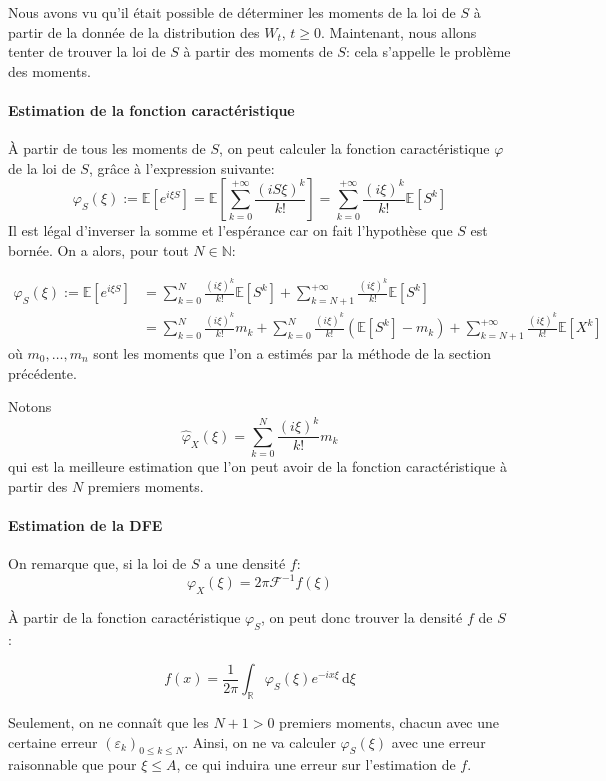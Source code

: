 \documentclass[12pt]{article}
\newcommand{\pth}[1]{\left(#1\right)}
\newcommand{\cro}[1]{\left[#1\right]}
\newcommand{\vg}{,\,}
\newcommand{\de}{\,\mathrm{d}}
\newcommand{\En}{\mathbb{N}}
\newcommand{\Esp}[1]{\mathbb{E}\cro{#1}}
\begin{document}
Nous avons vu qu'il était possible de déterminer les moments de la loi de $S$ à partir de la donnée de la distribution des $W_t\vg t\geqslant 0$. Maintenant, nous allons tenter de trouver la loi de $S$ à partir des moments de $S$: cela s'appelle le problème des moments.

\paragraph{Estimation de la fonction caractéristique}

À partir de tous les moments de $S$, on peut calculer la fonction caractéristique $\varphi$ de la loi de $S$, grâce à l'expression suivante:
\[\varphi_S(\xi):=\Esp{e^{i\xi S}}=\Esp{\sum_{k=0}^{+\infty}\frac{(iS\xi)^k}{k!}}=\sum_{k=0}^{+\infty}\frac{(i\xi)^k}{k!}\Esp{S^k}\]
Il est légal d'inverser la somme et l'espérance car on fait l'hypothèse que $S$ est bornée. On a alors, pour tout $N\in\En$:

\begin{align*}
\varphi_S(\xi):=\Esp{e^{i\xi S}}
&=\sum_{k=0}^{N}\frac{(i\xi)^k}{k!}\Esp{S^k}+\sum_{k=N+1}^{+\infty}\frac{(i\xi)^k}{k!}\Esp{S^k}\\
&= \sum_{k=0}^{N}\frac{(i\xi)^k}{k!}m_k + \sum_{k=0}^{N}\frac{(i\xi)^k}{k!}\pth{\Esp{S^k}-m_k}+\sum_{k=N+1}^{+\infty}\frac{(i\xi)^k}{k!}\Esp{X^k}
\end{align*}
où $m_0,\hdots, m_n$ sont les moments que l'on a estimés par la méthode de la section précédente.

Notons \[\hat{\varphi}_X(\xi)=\sum_{k=0}^{N}\frac{(i\xi)^k}{k!}m_k\] qui est la meilleure estimation que l'on peut avoir de la fonction caractéristique à partir des $N$ premiers moments.

\paragraph{Estimation de la DFE}

On remarque que, si la loi de $S$ a une densité $f$:
\[\varphi_X(\xi)=2\pi \mathcal{F}^{-1}f(\xi)\]

À partir de la fonction caractéristique $\varphi_S$, on peut donc trouver la densité $f$ de $S$ :

\[f(x) = \frac1{2\pi} \int_{\mathbb R}\varphi_S(\xi)e^{-ix\xi}\de\xi\]

Seulement, on ne connaît que les $N+1>0$ premiers moments, chacun avec une certaine erreur $(\varepsilon_k)_{0\leqslant k\leqslant N}$. Ainsi, on ne va calculer $\varphi_S(\xi)$ avec une erreur raisonnable que pour $\xi\leqslant A$, ce qui induira une erreur sur l'estimation de $f$.
\end{document}
